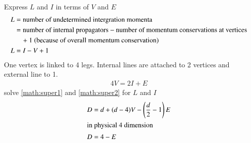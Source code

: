 Express $L$ and $I$ in terms of $V$ and $E$
\begin{align}
	L &= \text{number of undetermined intergration momenta} \notag \\
	  &= \text{number of internal propagators} - \text{number of momentum conservations at vertices} \notag\\
	  &\quad+ 1 \text{ (because of overall momentum conservation)} \notag \\
	L &= I - V + 1 \label{math:super1}
\end{align}
One vertex is linked to 4 legs. Internal lines are attached to 2 vertices and external line to 1.
\begin{align}
	4V = 2I + E \label{math:super2}
\end{align}
solve \ref{math:super1} and \ref{math:super2} for $L$ and $I$
\begin{align}
	D &= d + (d-4) V - \left(\frac{d}{2} - 1\right)E \\
	\shortintertext{in physical 4 dimension}
	D &= 4 - E
\end{align}


